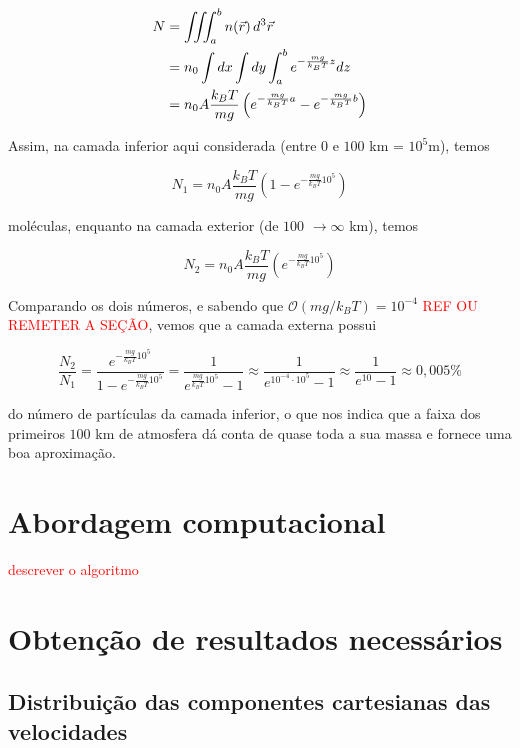 \documentclass[12pt]{extarticle} %
\begin{document}
\begin{align}
    N &= \iiint_{a}^{b}n(\vec{r})\,d^3\vec{r} \notag \\
        &=n_0\int dx \int dy \int_{a}^{b} e^{-\frac{mg}{k_BT}z}dz \notag \\
        &=n_0A\frac{k_BT}{mg}\left(e^{-\frac{mg}{k_BT}a}-e^{-\frac{mg}{k_BT}b}\right)
\label{N_a_b}
\end{align}


Assim, na camada inferior aqui considerada (entre $0$ e $100$ km = $10^5$m), temos

\begin{equation}
    N_1 = n_0A\frac{k_BT}{mg}\left(1-e^{-\frac{mg}{k_BT}10^5}\right)
\label{N_1}
\end{equation}

\noindent moléculas, enquanto na camada exterior (de $100$ $\rightarrow\infty$ km), temos

$$N_2 = n_0A\frac{k_BT}{mg}\left(e^{-\frac{mg}{k_BT}10^5}\right)$$

Comparando os dois números, e sabendo que $\mathcal{O}(mg/k_BT)\!=\!10^{-4}$ \textcolor{red}{REF OU REMETER A SEÇÃO}, vemos que a camada externa possui

$$\frac{N_2}{N_1} = \frac{e^{-\frac{mg}{k_BT}10^5}}{1-e^{-\frac{mg}{k_BT}10^5}} = \frac{1}{e^{\frac{mg}{k_BT}10^5}-1}\approx\frac{1}{e^{10^{-4}\cdot10^5}-1}\approx\frac{1}{e^{10}-1}\approx 0,005\%$$

\noindent do número de partículas da camada inferior, o que nos indica que a faixa dos primeiros $100$ km de atmosfera dá conta de quase toda a sua massa e fornece uma boa aproximação.




\section{Abordagem computacional}


\textcolor{red}{descrever o algoritmo}



\section{Obtenção de resultados necessários}

\subsection{Distribuição das componentes cartesianas das velocidades}
\end{document}
